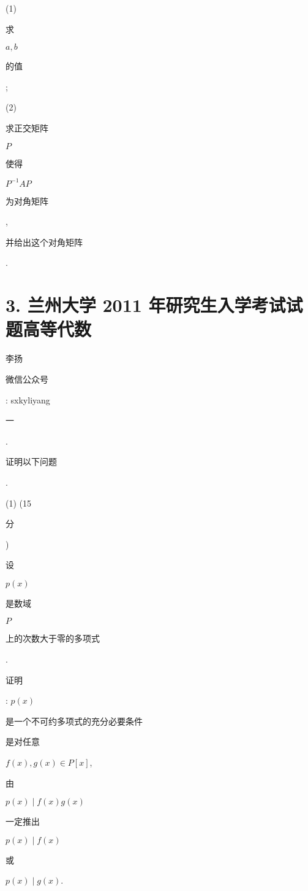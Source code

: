 \documentclass[10pt]{article}
\begin{document}
(1) \begin{CJK}{UTF8}{mj}求\end{CJK} $a, b$ \begin{CJK}{UTF8}{mj}的值\end{CJK};

(2) \begin{CJK}{UTF8}{mj}求正交矩阵\end{CJK} $P$ \begin{CJK}{UTF8}{mj}使得\end{CJK} $P^{-1} A P$ \begin{CJK}{UTF8}{mj}为对角矩阵\end{CJK}, \begin{CJK}{UTF8}{mj}并给出这个对角矩阵\end{CJK}.

\section{3. 兰州大学 2011 年研究生入学考试试题高等代数}
\begin{CJK}{UTF8}{mj}李扬\end{CJK}

\begin{CJK}{UTF8}{mj}微信公众号\end{CJK}: sxkyliyang

\begin{CJK}{UTF8}{mj}一\end{CJK}.\begin{CJK}{UTF8}{mj}证明以下问题\end{CJK}.

(1) (15 \begin{CJK}{UTF8}{mj}分\end{CJK}) \begin{CJK}{UTF8}{mj}设\end{CJK} $p(x)$ \begin{CJK}{UTF8}{mj}是数域\end{CJK} $P$ \begin{CJK}{UTF8}{mj}上的次数大于零的多项式\end{CJK}. \begin{CJK}{UTF8}{mj}证明\end{CJK}: $p(x)$ \begin{CJK}{UTF8}{mj}是一个不可约多项式的充分必要条件\end{CJK} \begin{CJK}{UTF8}{mj}是对任意\end{CJK} $f(x), g(x) \in P[x]$, \begin{CJK}{UTF8}{mj}由\end{CJK} $p(x) \mid f(x) g(x)$ \begin{CJK}{UTF8}{mj}一定推出\end{CJK} $p(x) \mid f(x)$ \begin{CJK}{UTF8}{mj}或\end{CJK} $p(x) \mid g(x)$.
\end{document}
